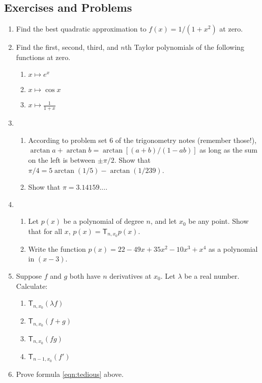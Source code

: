 \subsection{Exercises and Problems}
\begin{enumerate}
  \item Find the best quadratic approximation to $ f(x) = 1/(1 + x^2) $ at zero.
  \item Find the first, second, third, and $ n$th Taylor polynomials of the following functions at zero.
    \begin{enumerate}
      \item $ x \mapsto e^x $
      \item $ x \mapsto \cos x $
      \item $ x \mapsto \frac{1}{1 + x} $
    \end{enumerate}
  \item
    \begin{enumerate}
      \item According to problem set 6 of the trigonometry notes (remember those!), $ \arctan a + \arctan b = \arctan \left[(a + b)/(1 - ab)\right] $
            as long as the sum on the left is between $ \pm \pi/2 $. Show that $ \pi/4 = 5\arctan (1/5) - \arctan(1/239) $.
      \item Show that $ \pi = 3.14159... $.
    \end{enumerate}
  \item
    \begin{enumerate}
      \item Let $ p(x) $ be a polynomial of degree $ n $, and let $ x_0 $ be any point. Show that for all $ x $, $ p(x) = \mathsf{T}_{n, x_0} p(x) $.
      \item Write the function $ p(x) = 22 - 49 x + 35 x^2 - 10 x^3 + x^4 $ as a polynomial in $ (x-3) $.
    \end{enumerate}
  \item Suppose $ f $ and $ g $ both have $ n $ derivatives at $ x_0 $. Let $ \lambda $ be a real number. Calculate:
    \begin{enumerate}
      \item $ \mathsf{T}_{n, x_0} (\lambda f) $
      \item $ \mathsf{T}_{n, x_0} (f + g) $
      \item $ \mathsf{T}_{n, x_0} (fg) $
      \item $ \mathsf{T}_{n-1, x_0} (f') $
    \end{enumerate}
  \item Prove formula \ref{eqn:tedious} above.
\end{enumerate}


